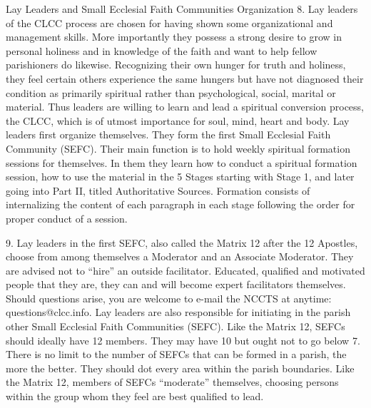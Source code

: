 \documentclass[oneside]{book}
\begin{document}
Lay Leaders and Small Ecclesial Faith Communities
Organization
8. Lay leaders of the CLCC process are chosen for having shown some
organizational and management skills. More importantly they possess a strong
desire to grow in personal holiness and in knowledge of the faith and want to
help fellow parishioners do likewise. Recognizing their own hunger for truth and
holiness, they feel certain others experience the same hungers but have not
diagnosed their condition as primarily spiritual rather than psychological,
social, marital or material. Thus leaders are willing to learn and lead a
spiritual conversion process, the CLCC, which is of utmost importance for soul,
mind, heart and body.
Lay leaders first organize themselves. They form the first Small Ecclesial Faith
Community (SEFC). Their main function is to hold weekly spiritual formation
sessions for themselves. In them they learn how to conduct a spiritual formation
session, how to use the material in the 5 Stages starting with Stage 1, and
later going into Part II, titled Authoritative Sources. Formation consists of
internalizing the content of each paragraph in each stage following the order
for proper conduct of a session.

9. Lay leaders in the first SEFC, also called the Matrix 12 after the 12
Apostles, choose from among themselves a Moderator and an Associate
Moderator. They are advised not to ``hire'' an outside facilitator. Educated,
qualified and motivated people that they are, they can and will become expert
facilitators themselves. Should questions arise, you are welcome to e-mail the
NCCTS at anytime: questions@clcc.info.
Lay leaders are also responsible for initiating in the parish other Small
Ecclesial Faith Communities (SEFC). Like the Matrix 12, SEFCs should ideally
have 12 members. They may have 10 but ought not to go below 7. There is no limit
to the number of SEFCs that can be formed in a parish, the more the better. They
should dot every area within the parish boundaries. Like the Matrix 12, members
of SEFCs ``moderate'' themselves, choosing persons within the group whom they
feel are best qualified to lead.
\end{document}
